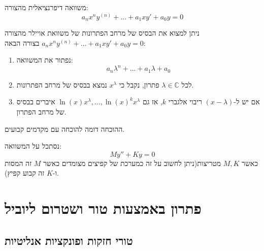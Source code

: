 \documentclass{tstextbook}
\begin{document}
\begin{definition}
משוואה דיפרנציאלית מהצורה:
$$a_n x^n y^{(n)}+...+a_1 x y' + a_0 y = 0$$

\end{definition}
\begin{proposition}
ניתן למצוא את הבסיס של מרחב הפתרונות של משוואת אויילר מהצורה \(a_n x^n y^{(n)}+...+a_1 x y' + a_0 y = 0\) בצורה הבאה:

  \begin{enumerate}
    \item נפתור את המשוואה: 
$$a_n \lambda^n + ... + a_1\lambda + a_0$$


    \item לכל \(\lambda \in \mathbb{C}\) פתרון, נקבל כי \(x^{\lambda}\) נמצא בבסיס של מרחב הפתרונות. 


    \item אם יש ל-\(\left( x-\lambda \right)\) ריבוי אלגברי \(k\), אז גם \(\ln(x)x^{\lambda},\dots,\ln(x)^{k}x^{\lambda}\) איברים בבסיס של מרחב הפתרון. 


  \end{enumerate}
\end{proposition}
ההוכחה דומה להוכחה עם מקדמים קבועים.

\begin{example}
נסתכל על המשוואה:
$$My''+Ky=0$$
כאשר \(M,K\) מטריצות(ניתן לחשוב על זה כמערכת של קפיצים מצומדים כאשר \(M\) זה המסות ו-\(K\) זה קבוע קפיץ).

\end{example}
\chapter{פתרון באמצעות טור ושטרום ליוביל}

\section{טורי חזקות ופונקציות אנליטיות}
\end{document}
